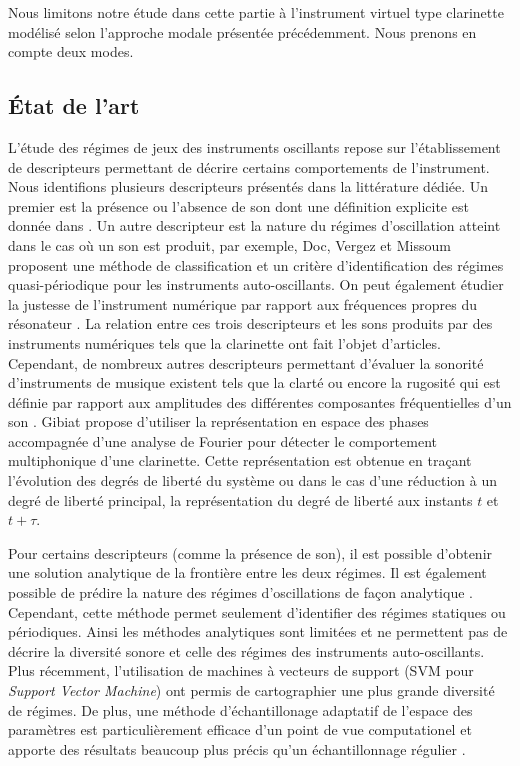 \documentclass[french, twocolumn]{article}
\begin{document}
Nous limitons notre étude dans cette partie à l'instrument virtuel type clarinette modélisé selon l'approche modale présentée précédemment. Nous prenons en compte deux modes. 

\subsection{État de l'art}

L'étude des régimes de jeux des instruments oscillants repose sur l'établissement de descripteurs permettant de décrire certains comportements de l'instrument. Nous identifions plusieurs descripteurs présentés dans la littérature dédiée. Un premier est la présence ou l'absence de son dont une définition explicite est donnée dans \cite{missoum_explicit_2014}. Un autre descripteur est la nature du régimes d'oscillation atteint dans le cas où un son est produit, par exemple, Doc, Vergez et Missoum \cite{doc2014minimal} proposent une méthode de classification et un critère d'identification des régimes quasi-périodique pour les instruments auto-oscillants.
On peut également étudier la justesse de l'instrument numérique par rapport aux fréquences propres du résonateur \cite{missoum_explicit_2014}. 
La relation entre ces trois descripteurs et les sons produits par des instruments numériques tels que la clarinette ont fait l'objet d'articles. 
Cependant, de nombreux autres descripteurs permettant d'évaluer la sonorité d'instruments de musique existent tels que la clarté ou encore la rugosité qui est définie par rapport aux amplitudes des différentes composantes fréquentielles d'un son \cite{pressnitzer1998perception}. 
Gibiat \cite{gibiat_phase_1988} propose d'utiliser la représentation en espace des phases accompagnée d'une analyse de Fourier pour détecter le comportement multiphonique d'une clarinette. Cette représentation est obtenue en traçant l'évolution des degrés de liberté du système ou dans le cas d'une réduction à un degré de liberté principal, la représentation du degré de liberté aux instants $t$ et $t + \tau$. 

Pour certains descripteurs (comme la présence de son), il est possible d'obtenir une solution analytique de la frontière entre les deux régimes. Il est également possible de prédire la nature des régimes d'oscillations de façon analytique \cite{chaigne2008acoustique}. Cependant, cette méthode permet seulement d'identifier des régimes statiques ou périodiques. Ainsi les méthodes analytiques sont limitées et ne permettent pas de décrire la diversité sonore et celle des régimes des instruments auto-oscillants. Plus récemment, l'utilisation de machines à vecteurs de support (SVM pour \textit{Support Vector Machine}) ont permis de cartographier une plus grande diversité de régimes. De plus, une méthode d'échantillonage adaptatif de l'espace des paramètres est particulièrement efficace d'un point de vue computationel et apporte des résultats beaucoup plus précis qu'un échantillonnage régulier \cite{missoum_explicit_2014}.
\end{document}
